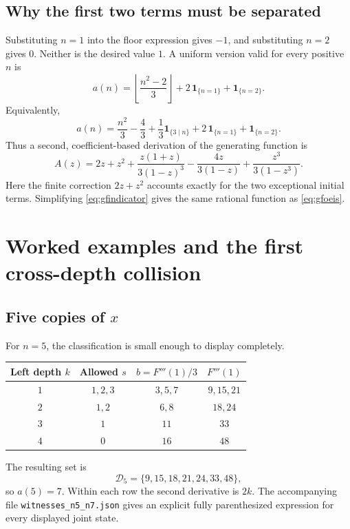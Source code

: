 \documentclass[11pt,letterpaper]{article}
\numberwithin{equation}{section}
\theoremstyle{definition}
\theoremstyle{remark}
\newcommand{\Dset}{\mathcal D}
\newcommand{\GF}{A(z)}
\begin{document}
\subsection{Why the first two terms must be separated}
Substituting $n=1$ into the floor expression gives $-1$, and
substituting $n=2$ gives $0$. Neither is the desired value $1$.
A uniform version valid for every positive $n$ is
\begin{equation}\label{eq:delta}
 a(n)=\left\lfloor\frac{n^2-2}{3}\right\rfloor
       +2\,\mathbf1_{\{n=1\}}+\mathbf1_{\{n=2\}}.
\end{equation}
Equivalently,
\begin{equation}\label{eq:periodic}
 a(n)=\frac{n^2}{3}-\frac43+\frac13\mathbf1_{\{3\mid n\}}
       +2\,\mathbf1_{\{n=1\}}+\mathbf1_{\{n=2\}}.
\end{equation}
Thus a second, coefficient-based derivation of the generating function is
\begin{equation}\label{eq:gfindicator}
 \GF=2z+z^2+\frac{z(1+z)}{3(1-z)^3}
       -\frac{4z}{3(1-z)}+\frac{z^3}{3(1-z^3)}.
\end{equation}
Here the finite correction $2z+z^2$ accounts exactly for the two
exceptional initial terms. Simplifying \eqref{eq:gfindicator} gives
the same rational function as \eqref{eq:gfoeis}.

\section{Worked examples and the first cross-depth collision}
\label{sec:examples}
\subsection{Five copies of \texorpdfstring{$x$}{x}}
For $n=5$, the classification is small enough to display completely.
\begin{center}
\begin{tabular}{@{}cccc@{}}
\toprule
Left depth $k$ & Allowed $s$ & $b=F'''(1)/3$ & $F'''(1)$\\
\midrule
$1$ & $1,2,3$ & $3,5,7$ & $9,15,21$\\
$2$ & $1,2$ & $6,8$ & $18,24$\\
$3$ & $1$ & $11$ & $33$\\
$4$ & $0$ & $16$ & $48$\\
\bottomrule
\end{tabular}
\end{center}
The resulting set is
\[
 \Dset_5=\{9,15,18,21,24,33,48\},
\]
so $a(5)=7$. Within each row the second derivative is $2k$.
The accompanying file \texttt{witnesses\_n5\_n7.json} gives an explicit
fully parenthesized expression for every displayed joint state.
\end{document}
